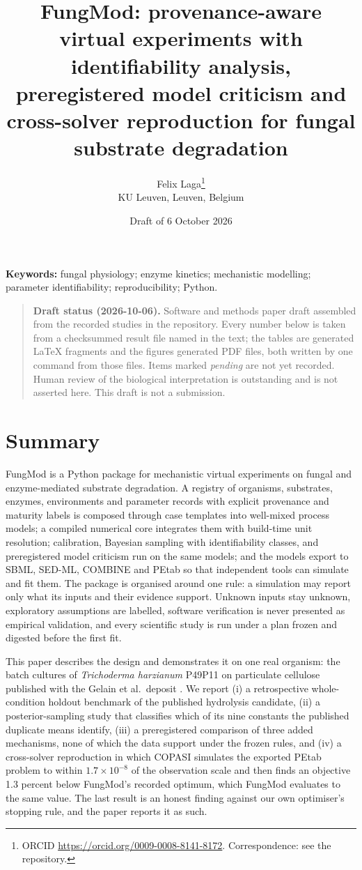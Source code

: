 \documentclass[11pt,a4paper]{article}
\title{FungMod: provenance-aware virtual experiments with identifiability
  analysis, preregistered model criticism and cross-solver reproduction for
  fungal substrate degradation}
\author{Felix Laga\thanks{ORCID \url{https://orcid.org/0009-0008-8141-8172}.
    Correspondence: see the repository.}\\
  KU Leuven, Leuven, Belgium}
\date{Draft of 6 October 2026}
\begin{document}
\maketitle

\noindent\textbf{Keywords:} fungal physiology; enzyme kinetics; mechanistic
modelling; parameter identifiability; reproducibility; Python.

\begin{quote}\small
\textbf{Draft status (2026-10-06).} Software and methods paper draft
assembled from the recorded studies in the repository. Every number below is
taken from a checksummed result file named in the text; the tables are
generated \LaTeX{} fragments and the figures generated PDF files, both
written by one command from those files. Items marked \emph{pending} are not
yet recorded. Human review of the biological interpretation is outstanding
and is not asserted here. This draft is not a submission.
\end{quote}

\section{Summary}

FungMod is a Python package for mechanistic virtual experiments on fungal
and enzyme-mediated substrate degradation. A registry of organisms,
substrates, enzymes, environments and parameter records with explicit
provenance and maturity labels is composed through case templates into
well-mixed process models; a compiled numerical core integrates them with
build-time unit resolution; calibration, Bayesian sampling with
identifiability classes, and preregistered model criticism run on the same
models; and the models export to SBML, SED-ML, COMBINE and PEtab so that
independent tools can simulate and fit them. The package is organised
around one rule: a simulation may report only what its inputs and their
evidence support. Unknown inputs stay unknown, exploratory assumptions are
labelled, software verification is never presented as empirical validation,
and every scientific study is run under a plan frozen and digested before
the first fit.

This paper describes the design and demonstrates it on one real organism:
the batch cultures of \emph{Trichoderma harzianum} P49P11 on particulate
cellulose published with the Gelain et al.\ deposit \citep{gelain2020}. We
report (i) a retrospective whole-condition holdout benchmark of the
published hydrolysis candidate, (ii) a posterior-sampling study that
classifies which of its nine constants the published duplicate means
identify, (iii) a preregistered comparison of three added mechanisms, none
of which the data support under the frozen rules, and (iv) a cross-solver
reproduction in which COPASI \citep{hoops2006} simulates the exported PEtab
problem \citep{schmiester2021} to within $1.7\times10^{-8}$ of the
observation scale and then finds an objective 1.3 percent below FungMod's
recorded optimum, which FungMod evaluates to the same value. The last result
is an honest finding against our own optimiser's stopping rule, and the
paper reports it as such.
\end{document}
